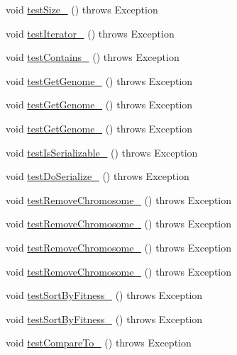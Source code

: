 \begin{DoxyCompactItemize}
void \hyperlink{classorg_1_1jgap_1_1_population_test_a6bb43e2483f966e539573973b3f54ff5}{test\-Size\-\_} ()  throws Exception 
\item 
void \hyperlink{classorg_1_1jgap_1_1_population_test_a0166b9a3de641654396b4e3bc8b98d2d}{test\-Iterator\-\_} ()  throws Exception 
\item 
void \hyperlink{classorg_1_1jgap_1_1_population_test_a4393d440303323ce113e13c9c2e38ca1}{test\-Contains\-\_} ()  throws Exception 
\item 
void \hyperlink{classorg_1_1jgap_1_1_population_test_aa80f24d8e63581100f0b4000dcadfe74}{test\-Get\-Genome\-\_} ()  throws Exception 
\item 
void \hyperlink{classorg_1_1jgap_1_1_population_test_a0530843e7f6f3e1f375e097c9933cc11}{test\-Get\-Genome\-\_} ()  throws Exception 
\item 
void \hyperlink{classorg_1_1jgap_1_1_population_test_aaa98422ce0cfb656bb3285bf89b73253}{test\-Get\-Genome\-\_} ()  throws Exception 
\item 
void \hyperlink{classorg_1_1jgap_1_1_population_test_a5cacb8100a607c8e5de48b2b2e53cee7}{test\-Is\-Serializable\-\_} ()  throws Exception 
\item 
void \hyperlink{classorg_1_1jgap_1_1_population_test_a7d137b9c86819f678045c2a8cc14cacf}{test\-Do\-Serialize\-\_} ()  throws Exception 
\item 
void \hyperlink{classorg_1_1jgap_1_1_population_test_a5b9f2d722065067a661ca15c5a1694f3}{test\-Remove\-Chromosome\-\_} ()  throws Exception 
\item 
void \hyperlink{classorg_1_1jgap_1_1_population_test_acf362393f1e95b3d9830d46a1773ba88}{test\-Remove\-Chromosome\-\_} ()  throws Exception 
\item 
void \hyperlink{classorg_1_1jgap_1_1_population_test_aa678b49705223eefe8791c7acb7e6a2f}{test\-Remove\-Chromosome\-\_} ()  throws Exception 
\item 
void \hyperlink{classorg_1_1jgap_1_1_population_test_a3bdc7b18f893611ec07f124ad10513cc}{test\-Remove\-Chromosome\-\_} ()  throws Exception 
\item 
void \hyperlink{classorg_1_1jgap_1_1_population_test_a02a80ea5ce66032e82ecca79a4066212}{test\-Sort\-By\-Fitness\-\_} ()  throws Exception 
\item 
void \hyperlink{classorg_1_1jgap_1_1_population_test_ab5e1815cd9ce70899cf423bb9230ae0a}{test\-Sort\-By\-Fitness\-\_} ()  throws Exception 
\item 
void \hyperlink{classorg_1_1jgap_1_1_population_test_a9d51637191e1ba2efd816344a26dabf5}{test\-Compare\-To\-\_} ()  throws Exception 

\end{DoxyCompactItemize}

